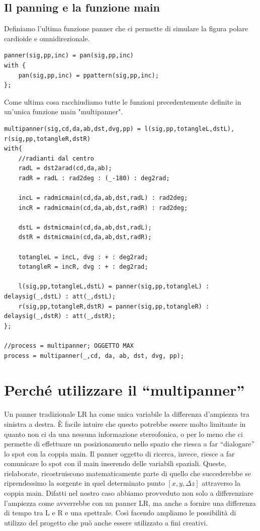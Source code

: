 \documentclass{article}
\begin{document}
\subsection{Il panning e la funzione main}
Definiamo l'ultima funzione panner che ci permette di simulare la figura polare cardioide e omnidirezionale. 
\begin{lstlisting}
panner(sig,pp,inc) = pan(sig,pp,inc)
with {
    pan(sig,pp,inc) = ppattern(sig,pp,inc); 
};
\end{lstlisting}

Come ultima cosa racchiudiamo tutte le funzioni precedentemente definite in un'unica funzione main "multipanner".

\begin{lstlisting}
multipanner(sig,cd,da,ab,dst,dvg,pp) = l(sig,pp,totangleL,dstL), r(sig,pp,totangleR,dstR)
with{
    //radianti dal centro
    radL = dst2arad(cd,da,ab);
    radR = radL : rad2deg : (_-180) : deg2rad;

    incL = radmicmain(cd,da,ab,dst,radL) : rad2deg;
    incR = radmicmain(cd,da,ab,dst,radR) : rad2deg;

    dstL = dstmicmain(cd,da,ab,dst,radL);
    dstR = dstmicmain(cd,da,ab,dst,radR);

    totangleL = incL, dvg : + : deg2rad;
    totangleR = incR, dvg : + : deg2rad;

    l(sig,pp,totangleL,dstL) = panner(sig,pp,totangleL) : delaysig(_,dstL) : att(_,dstL);
    r(sig,pp,totangleR,dstR) = panner(sig,pp,totangleR) : delaysig(_,dstR) : att(_,dstR);
};

//process = multipanner; OGGETTO MAX
process = multipanner(_,cd, da, ab, dst, dvg, pp);
\end{lstlisting}
\section{Perché utilizzare il ``multipanner''}
    
    Un panner tradizionale LR ha come unica variabile la differenza d'ampiezza tra sinistra a destra. È facile intuire che questo potrebbe essere molto limitante in quanto non ci da una nessuna informazione stereofonica, o per lo meno che ci permette di effettuare un posizionamento nello spazio che riesca a far ``dialogare'' lo spot con la coppia main. Il panner oggetto di ricerca, invece, riesce a far comunicare lo spot con il main inserendo delle variabili spaziali. 
    Queste, rielaborate, ricostruiscono matematicamente parte di quello che succederebbe se riprendessimo la sorgente in quel determinato punto $[x, y, \Delta z]$ attraverso la coppia main. 
    Difatti nel nostro caso abbiamo provveduto non solo a differenziare l'ampiezza come avverrebbe con un panner LR, ma anche a fornire una differenza di tempo tra L e R e una spettrale. Così facendo ampliamo le possibilità di utilizzo del progetto che può anche essere utilizzato a fini creativi.
\end{document}
